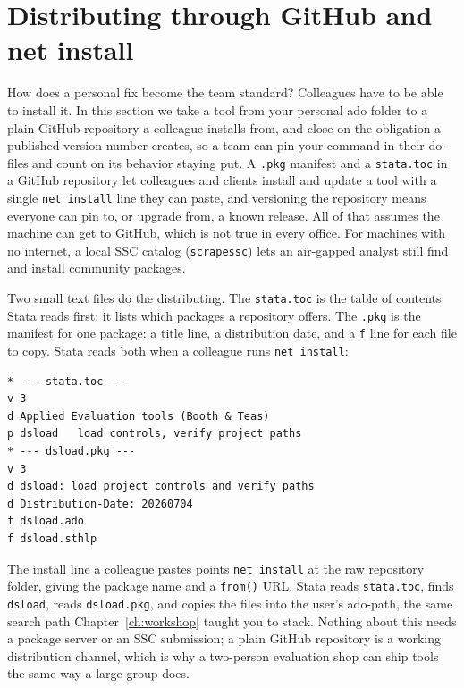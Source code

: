 \section{Distributing through GitHub and net install}
How does a personal fix become the team standard? Colleagues have to be able to install it. In this section we take a tool from your personal ado folder to a plain GitHub repository a colleague installs from, and close on the obligation a published version number creates, so a team can pin your command in their do-files and count on its behavior staying put. A \texttt{.pkg} manifest and a \texttt{stata.toc} in a GitHub repository let colleagues and clients install and update a tool with a single \texttt{net install} line they can paste, and versioning the repository means everyone can pin to, or upgrade from, a known release. All of that assumes the machine can get to GitHub, which is not true in every office. For machines with no internet, a local SSC catalog (\texttt{scrapessc}) lets an air-gapped analyst still find and install community packages.

Two small text files do the distributing. The \texttt{stata.toc} is the table of contents Stata reads first: it lists which packages a repository offers. The \texttt{.pkg} is the manifest for one package: a title line, a distribution date, and a \texttt{f} line for each file to copy. Stata reads both when a colleague runs \texttt{net install}:
\par
{\footnotesize
\begin{verbatim}
* --- stata.toc ---
v 3
d Applied Evaluation tools (Booth & Teas)
p dsload   load controls, verify project paths
* --- dsload.pkg ---
v 3
d dsload: load project controls and verify paths
d Distribution-Date: 20260704
f dsload.ado
f dsload.sthlp
\end{verbatim}
}
The install line a colleague pastes points \texttt{net install} at the raw repository folder, giving the package name and a \texttt{from()} URL. Stata reads \texttt{stata.toc}, finds \texttt{dsload}, reads \texttt{dsload.pkg}, and copies the files into the user's ado-path, the same search path Chapter~\ref{ch:workshop} taught you to stack. Nothing about this needs a package server or an SSC submission; a plain GitHub repository is a working distribution channel, which is why a two-person evaluation shop can ship tools the same way a large group does.

